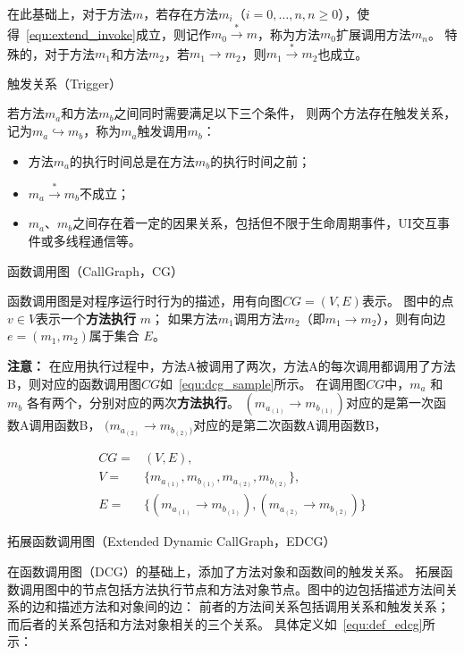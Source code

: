 在此基础上，对于方法$m$，若存在方法$m_i$（$i=0,\dots,n , n \geqslant 0$），使得~\autoref{equ:extend_invoke}成立，则记作$m_0 \stackrel{\ast}{\to} m$，称为方法$m_0$扩展调用方法$m_n$。
特殊的，对于方法$m_1$和方法$m_2$，若$m_1 \to m_2$，则$m_1  \stackrel{\ast}{\to}  m_2$也成立。

\begin{myDef}
	触发关系（Trigger）
\end{myDef}
	
	若方法$m_a$和方法$m_b$之间同时需要满足以下三个条件，
	则两个方法存在触发关系，记为$m_a \hookrightarrow m_b$，称为$m_a$触发调用$m_b$：
	
	\begin{itemize}
		\item 方法$m_a$的执行时间总是在方法$m_b$的执行时间之前；
		\item $m_a \stackrel{\ast}{\to} m_b $不成立；
		\item $m_a$、$m_b$之间存在着一定的因果关系，包括但不限于生命周期事件，UI交互事件或多线程通信等。
	\end{itemize}


\begin{myDef}
	函数调用图（CallGraph，CG）
\end{myDef}	
	函数调用图是对程序运行时行为的描述，用有向图$CG = ( V , E)$表示。 图中的点$ v \in V $表示一个\textbf{方法执行} $m$；
	如果方法$m_1$调用方法$m_2$（即$m_1 \to m_2$），则有向边 $e = (m_1 ,m_2)$属于集合 $E$。 


\textbf{注意：}
在应用执行过程中，方法A被调用了两次，方法A的每次调用都调用了方法B，则对应的函数调用图$CG$如~\autoref{equ:dcg_sample}所示。
在调用图$CG$中，$m_a$ 和 $m_b$ 各有两个，分别对应的两次\textbf{方法执行}。
$(m_{a_{(1)}} \to m_{b_{(1)}})$对应的是第一次函数A调用函数B，
$(m_{a_{(2)}} \to m_{b_{(2)})}$对应的是第二次函数A调用函数B，

\begin{equation}
\begin{aligned}
CG = &(V,E) ,\\ 
V = & \{m_{a_{(1)}},m_{b_{(1)}},m_{a_{(2)}},m_{b_{(2)}}\}, \\ 
E = & \{  
(  m_{a_{(1)}} \to m_{b_{(1)}}) ,( m_{a_{(2)}} \to m_{b_{(2)}})
\} 
\end{aligned}
\label{equ:dcg_sample} 
\end{equation}



\begin{myDef}
	拓展函数调用图（Extended Dynamic CallGraph，EDCG）
\end{myDef}
	在函数调用图（DCG）的基础上，添加了方法对象和函数间的触发关系。
	拓展函数调用图中的节点包括方法执行节点和方法对象节点。图中的边包括描述方法间关系的边和描述方法和对象间的边：
	前者的方法间关系包括调用关系和触发关系；而后者的关系包括和方法对象相关的三个关系。
	具体定义如~\autoref{equ:def_edcg}所示：
	
